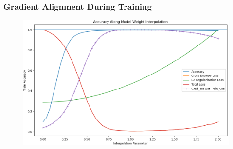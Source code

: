 \begin{frame}
\frametitle{Gradient Alignment During Training}
\begin{figure}[h]
\centering
\includegraphics[width=.95\textwidth]{c4_figures/stab-n-201mnist-C32-100-100-10-0.001-0.0001-eval-mod_int_acc-trn.png}
\end{figure}
\end{frame}

